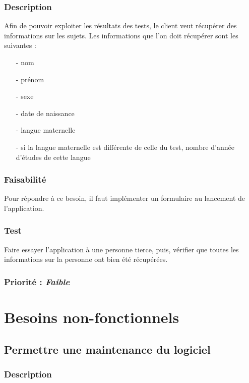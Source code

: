 \subsubsection{Description}

Afin de pouvoir exploiter les résultats des tests, le client veut récupérer des informations sur les sujets.
Les informations que l’on doit récupérer sont les suivantes :\\
\begin{itemize}
 \item[-]  nom
 \item[-]  prénom
 \item[-]  sexe
 \item[-]  date de naissance
 \item[-]  langue maternelle
 \item[-]  si la langue maternelle est différente de celle du test, nombre d’année d’études de cette langue
\end{itemize}

\subsubsection{Faisabilité}
  
Pour répondre à ce besoin, il faut implémenter un formulaire au lancement de l’application.

\subsubsection{Test}

Faire essayer l’application à une personne tierce, puis, vérifier que toutes les informations sur la personne ont bien été récupérées.

\subsubsection{Priorité : \textit{Faible}}

\section{Besoins non-fonctionnels}\label{besoins_non-fonctionnels}

\subsection{Permettre une maintenance du logiciel}

\subsubsection{Description}

